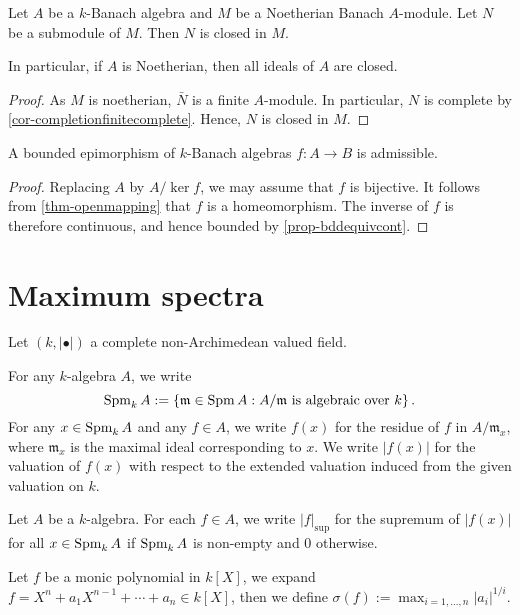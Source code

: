 \begin{corollary}\label{cor-idealclosed}
    Let $A$ be a $k$-Banach algebra and $M$ be a Noetherian Banach $A$-module. Let $N$ be a submodule of $M$. Then $N$ is closed in $M$.

    In particular, if $A$ is Noetherian, then all ideals of $A$ are closed.
\end{corollary}
\begin{proof}
    As $M$ is noetherian, $\bar{N}$ is a finite $A$-module. In particular, $N$ is complete by \cref{cor-completionfinitecomplete}. Hence, $N$ is closed in $M$.
\end{proof}

\begin{corollary}\label{cor-bddisadmi}
    A bounded epimorphism of $k$-Banach algebras $f:A\rightarrow B$ is admissible.
\end{corollary}
\begin{proof}
    Replacing $A$ by $A/\ker f$, we may assume that $f$ is bijective. It follows from \cref{thm-openmapping} that $f$ is a homeomorphism. The inverse of $f$ is therefore continuous, and hence bounded by \cref{prop-bddequivcont}.
\end{proof}

\section{Maximum spectra}
Let $(k,|\bullet|)$ a complete non-Archimedean valued field.

\begin{definition}
    For any $k$-algebra $A$, we write
    \[
      \operatorname{Spm}_k A:=\left\{\mathfrak{m}\in \operatorname{Spm} A:A/\mathfrak{m}\text{ is algebraic over }k\right\}.  
    \]
    For any $x\in \operatorname{Spm}_k A$ and any $f\in A$, we write $f(x)$ for the residue of $f$ in $A/\mathfrak{m}_x$, where $\mathfrak{m}_x$ is the maximal ideal corresponding to $x$. We write $|f(x)|$ for the valuation of $f(x)$ with respect to the extended valuation induced from the given valuation on $k$.
\end{definition}

\begin{definition}
    Let $A$ be a $k$-algebra.
    For each $f\in A$, we write $|f|_{\sup}$ for the supremum of $|f(x)|$ for all $x\in \operatorname{Spm}_k A$ if $\operatorname{Spm}_k A$ is non-empty and $0$ otherwise.
\end{definition}

\begin{definition}
    Let $f$ be a monic polynomial in $k[X]$, we expand $f=X^n+a_{1}X^{n-1}+\cdots +a_n\in k[X]$, then we define $\sigma(f):=\max_{i=1,\ldots,n}|a_i|^{1/i}$.
\end{definition}

